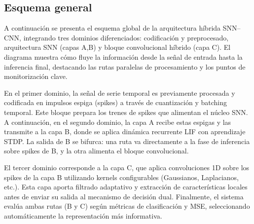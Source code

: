 



    
\subsection{Esquema general}

A continuación se presenta el esquema global de la arquitectura híbrida SNN–CNN, integrando tres dominios diferenciados: codificación y preprocesado, arquitectura SNN (capas A,B) y bloque convolucional híbrido (capa C). El diagrama muestra cómo fluye la información desde la señal de entrada hasta la inferencia final, destacando las rutas paralelas de procesamiento y los puntos de monitorización clave.

En el primer dominio, la señal de serie temporal es previamente procesada y codificada en impulsos espiga (spikes) a través de cuantización y batching temporal. Este bloque prepara los trenes de spikes que alimentan el núcleo SNN. A continuación, en el segundo dominio, la capa A recibe estas espigas y las transmite a la capa B, donde se aplica dinámica recurrente LIF con aprendizaje STDP. La salida de B se bifurca: una ruta va directamente a la fase de inferencia sobre spikes de B, y la otra alimenta el bloque convolucional.

El tercer dominio corresponde a la capa C, que aplica convoluciones 1D sobre los spikes de la capa B utilizando kernels configurables (Gaussianos, Laplacianos, etc.). Esta capa aporta filtrado adaptativo y extracción de características locales antes de enviar su salida al mecanismo de decisión dual. Finalmente, el sistema evalúa ambas rutas (B y C) según métricas de clasificación y MSE, seleccionando automáticamente la representación más informativa.

